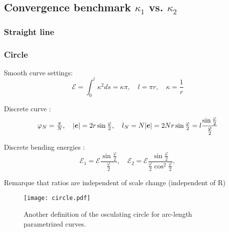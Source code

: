 \subsection{Convergence benchmark $\kappa_1$ vs. $\kappa_2$}

\subsubsection{Straight line}

\subsubsection{Circle}

Smooth curve settings:
\begin{equation}
	\mathcal{E} = \int_0^l \kappa^2 ds = \kappa \pi,
	\quad
	l = \pi r,
	\quad
	\kappa = \frac{1}{r}
\end{equation}

Discrete curve :
\begin{equation}
	\varphi_N = \tfrac{\pi}{N},
	\quad
	|\boldsymbol{e}| = 2r\sin \tfrac{\varphi}{2},
	\quad
	l_N = N|\boldsymbol{e}| =2Nr\sin \tfrac{\varphi}{2} = l \frac{\sin \tfrac{\varphi}{2}}{\tfrac{\varphi}{2}}
\end{equation}

Discrete bending energies :
\begin{equation}
	\mathcal{E}_1 = \mathcal{E} \frac{\sin \tfrac{\varphi}{2}}{\tfrac{\varphi}{2}},
	\quad
	\mathcal{E}_2 = \mathcal{E} \frac{\sin \tfrac{\varphi}{2}}{\tfrac{\varphi}{2} \cos^2 \tfrac{\varphi}{2}},
\end{equation}

Remarque that ratios are independent of scale change (independent of R)

\begin{figure}[H] 
\begin{center}
\texttt{[image: circle.pdf]} 
\caption{Another definition of the osculating circle for arc-length parametrized curves.}
\label{fig:1_1}
\end{center}
\end{figure}

